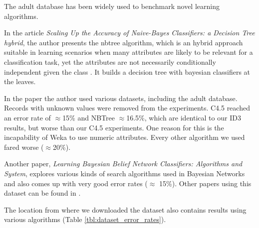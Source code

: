 \documentclass[a4paper]{llncs}
\begin{document}
The adult database has been widely used to benchmark novel learning algorithms.

In the article \textit{Scaling Up the Accuracy of Naive-Bayes Classifiers: a Decision Tree hybrid},
the author presents the nbtree algorithm, which is an hybrid approach suitable in learning scenarios
when many attributes are likely to be relevant for a classification task, yet the attributes
are not necessarily conditionally independent given the class \cite{nbtree}. It builds
a decision tree with bayesian classifiers at the leaves.

In the paper the author used various datasets, including the adult database. Records with unknown values
were removed from the experiments. C4.5 reached an error rate of $\approx$15\% and NBTree $\approx$16.5\%,
which are identical to our ID3 results, but worse than our C4.5 experiments. One reason for this is
the incapability of Weka to use numeric attributes. Every other algorithm we used fared worse ($\approx$20\%).

Another paper, \textit{Learning Bayesian Belief Network Classifiers: Algorithms and System}, explores
various kinds of search algorithms used in Bayesian Networks and also comes up with very good error rates ($\approx$ 15\%).
Other papers using this dataset can be found in \cite{dataset_papers}.

The location from where we downloaded the dataset also contains results
using various algorithms (Table \ref{tbl:dataset_error_rates}).
\end{document}
